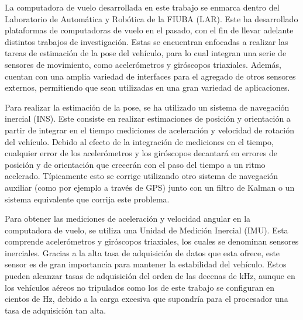 
La computadora de vuelo desarrollada en este trabajo se enmarca dentro del Laboratorio de Automática y Robótica de la FIUBA (LAR). Este ha desarrollado plataformas de computadoras de vuelo en el pasado, con el fin de llevar adelante distintos trabajos de investigación. Estas se encuentran enfocadas a realizar las tareas de estimación de la pose del vehículo, para lo cual integran una serie de sensores de movimiento, como acelerómetros y giróscopos triaxiales. Además, cuentan con una amplia variedad de interfaces para el agregado de otros sensores externos, permitiendo que sean utilizadas en una gran variedad de aplicaciones.

Para realizar la estimación de la pose, se ha utilizado un sistema de navegación inercial (INS). Este consiste en realizar estimaciones de posición y orientación a partir de integrar en el tiempo mediciones de aceleración y velocidad de rotación del vehículo. Debido al efecto de la integración de mediciones en el tiempo, cualquier error de los acelerómetros y los giróscopos decantará en errores de posición y de orientación que crecerán con el paso del tiempo a un ritmo acelerado. Típicamente esto se corrige utilizando otro sistema de navegación auxiliar (como por ejemplo a través de GPS) junto con un filtro de Kalman o un sistema equivalente que corrija este problema.

Para obtener las mediciones de aceleración y velocidad angular en la computadora de vuelo, se utiliza una Unidad de Medición Inercial (IMU). Esta comprende acelerómetros y giróscopos triaxiales, los cuales se denominan sensores inerciales. Gracias a la alta tasa de adquisición de datos que esta ofrece, este sensor es de gran importancia para mantener la estabilidad del vehículo. Estos pueden alcanzar tasas de adquisición del orden de las decenas de kHz, aunque en los vehículos aéreos no tripulados como los de este trabajo se configuran en cientos de Hz, debido a la carga excesiva que supondría para el procesador una tasa de adquisición tan alta.

